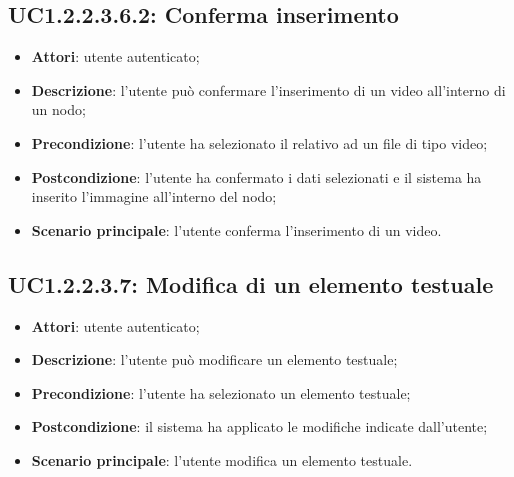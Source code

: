 \subsection{UC1.2.2.3.6.2: Conferma inserimento}
\label{UC1.2.2.3.6.2}
\begin{itemize}
\item \textbf{Attori}: utente autenticato;
\item \textbf{Descrizione}: l'utente può confermare l'inserimento di un video all'interno di un nodo;
\item \textbf{Precondizione}: l'utente ha selezionato il  relativo ad un file di tipo video;
\item \textbf{Postcondizione}: l'utente ha confermato i dati selezionati e il sistema ha inserito l'immagine all'interno del nodo;
\item \textbf{Scenario principale}:
l'utente conferma l'inserimento di un video.
\end{itemize}
\subsection{UC1.2.2.3.7: Modifica di un elemento testuale}
\label{UC1.2.2.3.7}
\begin{itemize}
\item \textbf{Attori}: utente autenticato;
\item \textbf{Descrizione}: l'utente può modificare un elemento testuale;
\item \textbf{Precondizione}: l'utente ha selezionato un elemento testuale;
\item \textbf{Postcondizione}: il sistema ha applicato le modifiche indicate dall'utente;
\item \textbf{Scenario principale}:
l'utente modifica un elemento testuale.
\end{itemize}
